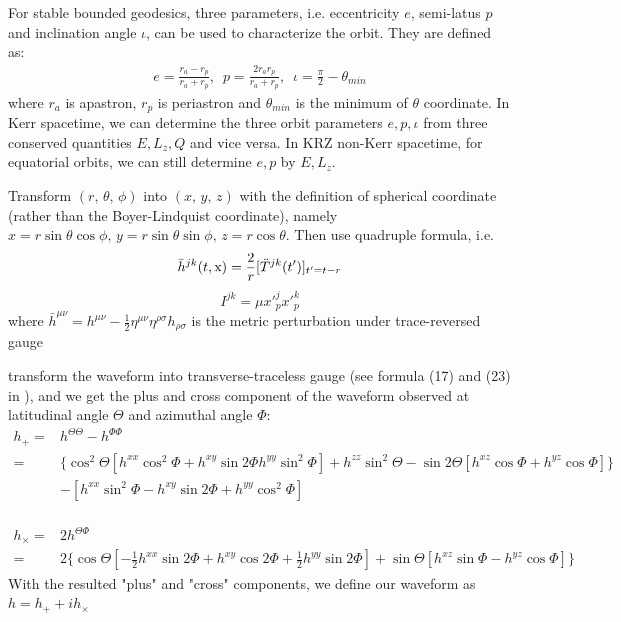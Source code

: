 \documentclass{article}
\begin{document}
For stable bounded geodesics, three parameters, i.e. eccentricity $e$, semi-latus $p$ and inclination angle $\iota$, can be used to characterize the orbit. They are defined as:
\begin{equation}
\begin{aligned}
e=\frac{r_a-r_p}{r_a+r_p},\,\,\, p=\frac{2r_a r_p}{r_a+r_p},\,\,\, \iota=\frac \pi 2 -\theta_{min}
\end{aligned}
\end{equation} 
where $r_a$ is apastron, $r_p$ is periastron and $\theta_{min}$ is the minimum of $\theta$ coordinate. In Kerr spacetime, we can determine the three orbit parameters $e,p,\iota$ from three conserved quantities $E,L_z,Q$ and vice versa. In KRZ non-Kerr spacetime, for equatorial orbits, we can still determine $e,p$ by $E,L_z$.

Transform $(r,\,\theta,\,\phi)$ into $(x,\,y,\,z)$ with the definition of spherical coordinate (rather than the Boyer-Lindquist coordinate), namely $x=r\sin\theta \cos \phi,\, y=r\sin\theta\sin\phi,\, z=r\cos\theta$. Then use quadruple formula, i.e.
\begin{equation}
	\bar{h}^{jk}(t,{\rm {x}})= \frac 2 r [\ddot{T}^{jk} (t')]_{t'=t-r}
\end{equation}
\begin{equation}
	I^{jk}=\mu x'^j_p x'^k_p
\end{equation}
where $\bar{h}^{\mu\nu} = h^{\mu\nu} - \frac 1 2 \eta^{\mu\nu} \eta^{\rho\sigma} h_{\rho\sigma} $ is the metric perturbation under trace-reversed gauge

transform the waveform into transverse-traceless gauge (see formula (17) and (23) in \cite{kludge}), and we get the plus and cross component of the waveform observed at latitudinal angle $\Theta $ and azimuthal angle $\Phi$:
\begin{equation}
\begin{aligned}
h_+ =& h^{\Theta\Theta} - h^{\Phi\Phi}\\
=& \{ \cos^2 \Theta [ h^{xx} \cos^2 \Phi + h^{xy} \sin 2\Phi h^{yy} \sin^2 \Phi ] + h^{zz} \sin^2\Theta - \sin 2\Theta [h^{xz} \cos \Phi + h^{yz} \cos \Phi ] \}\\
&- [ h^{xx} \sin^2\Phi - h^{xy} \sin 2\Phi + h^{yy} \cos^2 \Phi ]
\end{aligned}
\end{equation}\\
\begin{equation}
\begin{aligned}
h_\times =& 2 h^{\Theta\Phi} \\
=& 2 \{ \cos\Theta[-\frac 12 h^{xx} \sin 2\Phi + h^{xy} \cos 2\Phi + \frac 12 h^{yy} \sin 2\Phi ] + \sin \Theta [h^{xz} \sin \Phi - h^{yz} \cos \Phi ] \}
\end{aligned}
\end{equation}
With the resulted "plus" and "cross" components, we define our waveform as $h = h_+ + i h_\times$
\end{document}
